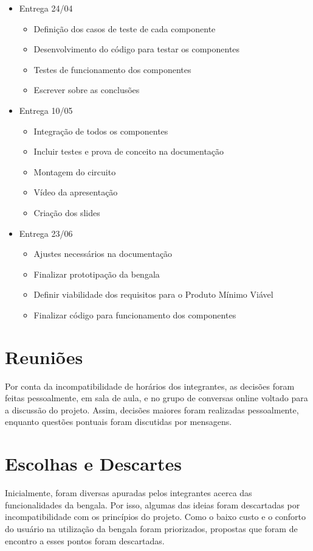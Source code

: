 \begin{itemize}
\begin{itemize}
        \end{itemize}
        \item Entrega 24/04
        \begin{itemize}
            \item Definição dos casos de teste de cada componente
            \item Desenvolvimento do código para testar os componentes
            \item Testes de funcionamento dos componentes
            \item Escrever sobre as conclusões
        \end{itemize}
        \item Entrega 10/05
        \begin{itemize}
            \item Integração de todos os componentes
            \item Incluir testes e prova de conceito na documentação
            \item Montagem do circuito
            \item Vídeo da apresentação
            \item Criação dos slides
        \end{itemize}
        \item Entrega 23/06
        \begin{itemize}
            \item Ajustes necessários na documentação
            \item Finalizar prototipação da bengala
            \item Definir viabilidade dos requisitos para o Produto Mínimo Viável
            \item Finalizar código para funcionamento dos componentes
        \end{itemize}
    \end{itemize}

    \section{Reuniões}

    Por conta da incompatibilidade de horários dos integrantes, as decisões foram feitas pessoalmente, em sala de aula, e no grupo de conversas online voltado para a discussão do projeto. Assim, decisões maiores foram realizadas pessoalmente, enquanto questões pontuais foram discutidas por mensagens.

    \section{Escolhas e Descartes}
    Inicialmente, foram diversas apuradas pelos integrantes acerca das funcionalidades da bengala. Por isso, algumas das ideias foram descartadas por incompatibilidade com os princípios do projeto. Como o baixo custo e o conforto do usuário na utilização da bengala foram priorizados, propostas que foram de encontro a esses pontos foram descartadas.

